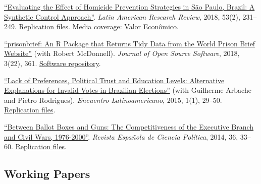 \documentclass[a4paper]{article}
\renewenvironment{itemize}{
	\begin{list}{}{
			\setlength{\leftmargin}{1.5em}
		}
		}{
	\end{list}
}
\begin{document}
\begin{itemize}
\item \href{https://doi.org/10.25222/larr.334}{``Evaluating the Effect of Homicide Prevention Strategies in São Paulo, Brazil: A Synthetic Control Approach''}. \textit{Latin American Research Review}, 2018, 53(2), 231--249. \href{https://github.com/danilofreire/homicides-sp-synth}{Replication files}. Media coverage: \href{http://www.valor.com.br/cultura/5111524/sangue-no-asfalto}{Valor Econômico}.
\item \href{https://doi.org/10.21105/joss.00361}{``prisonbrief: An R Package that Returns Tidy Data from the World Prison Brief Website''} (with Robert McDonnell). \textit{Journal of Open Source Software}, 2018, 3(22), 361. \href{https://github.com/danilofreire/prisonbrief}{Software repository}.
\item \href{http://www.iapss.org/wp-content/uploads/2014/10/ELA1.1_2.Lack-of-Preferences-Political-Trust-and-Education-Levels.pdf}{``Lack of Preferences, Political Trust and Education Levels: Alternative Explanations for Invalid Votes in Brazilian Elections''} (with Guilherme Arbache and Pietro Rodrigues). \textit{Encuentro Latinoamericano}, 2015, 1(1), 29--50. \href{https://github.com/danilofreire/invalid-votes-brazil}{Replication files}.
\item \href{http://recyt.fecyt.es/index.php/recp/article/view/37638}{``Between Ballot Boxes and Guns: The Competitiveness of the Executive Branch and Civil Wars, 1976-2000''}. \textit{Revista Española de Ciencia Política}, 2014, 36, 33--60. \href{https://doi.org/10.7910/DVN/NSDUYG}{Replication files}.
\end{itemize}

\subsection*{Working Papers}
\end{document}
